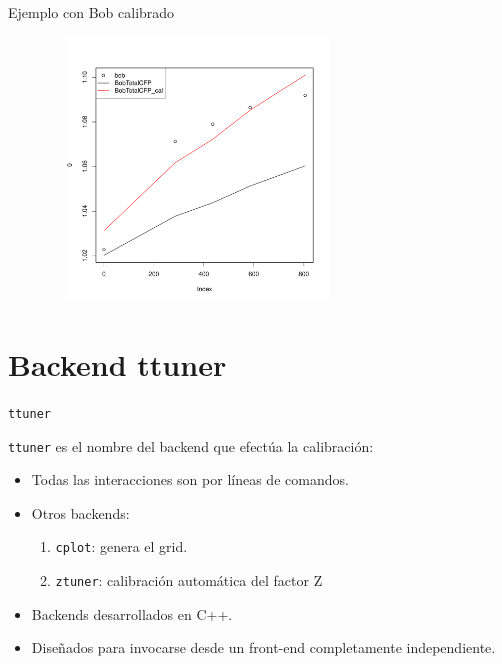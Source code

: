 \documentclass{beamer}
\begin{document}
\begin{frame}{Ejemplo con Bob calibrado}
 \begin{center}
  \includegraphics[width=10cm, height=7cm]{bob-cal}
 \end{center}
\end{frame}

\newcommand{\ttuner}{{\tt ttuner}\xspace}

\section{Backend ttuner}

\begin{frame}{\ttuner}
 
\ttuner es el nombre del backend que efectúa la calibración:

\begin{itemize}
 \item Todas las interacciones son por líneas de comandos.

 \item Otros backends:
       \begin{enumerate}
	\item {\tt cplot}: genera el grid.
	\item {\tt ztuner}: calibración automática del factor Z
       \end{enumerate}

 \item Backends desarrollados en C++.

 \item Diseñados para invocarse desde un front-end completamente independiente.

\end{itemize}



\end{frame}
\end{document}
